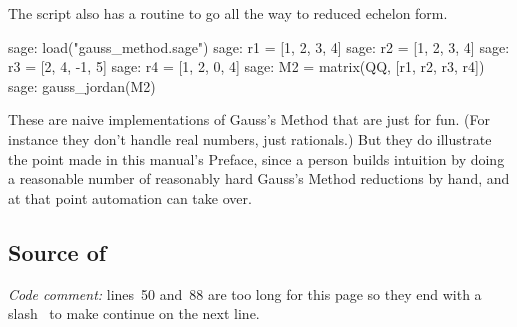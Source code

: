 The script also has a routine to go all the way to reduced echelon form.
\begin{sagecommandline}
sage: load("gauss_method.sage")
sage: r1 = [1, 2, 3, 4]
sage: r2 = [1, 2, 3, 4]
sage: r3 = [2, 4, -1, 5]
sage: r4 = [1, 2, 0, 4]
sage: M2 = matrix(QQ, [r1, r2, r3, r4])
sage: gauss_jordan(M2)            
\end{sagecommandline}

These are naive implementations of Gauss's Method that are just for fun.
(For instance they don't handle real numbers, just rationals.)
But they do illustrate the point made in this manual's Preface, 
since a person
builds intuition by doing a reasonable number of reasonably hard Gauss's Method
reductions by hand, and at that point automation can take over.


\subsection{Source of \protect{}}
\textit{Code comment:} lines~50 and~88 are too long
for this page so they end with a 
slash~\inlinecode{\\} to make \python{} continue on the
next line. 


\endinput


TODO:
